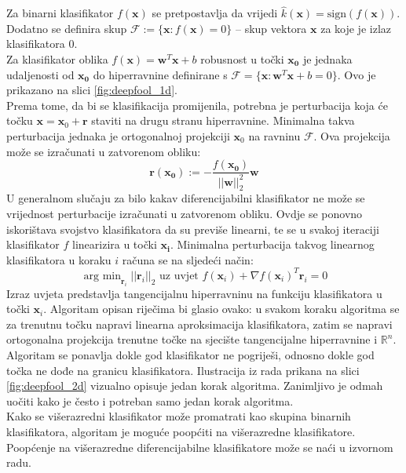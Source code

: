 \documentclass[utf8, diplomski]{fer}
\begin{document}
Za binarni klasifikator $f(\boldsymbol{x})$ se pretpostavlja da vrijedi $\hat{k}(\boldsymbol{x}) = \text{sign}(f(\boldsymbol{x}))$. Dodatno se definira skup $\mathscr{F} := \{\boldsymbol{x} : f(\boldsymbol{x}) = 0\}$ -- skup vektora $\boldsymbol{x}$ za koje je izlaz klasifikatora $0$. \\
Za klasifikator oblika $f(\boldsymbol{x}) = \boldsymbol{w}^{T}\boldsymbol{x} + b$ robusnost u točki $\boldsymbol{x_{0}}$ je jednaka udaljenosti od $\boldsymbol{x_{0}}$ do hiperravnine definirane s $\mathscr{F} = \{\boldsymbol{x} : \boldsymbol{w}^{T}\boldsymbol{x}+b=0\}$. Ovo je prikazano na slici \ref{fig:deepfool_1d}. \\
Prema tome, da bi se klasifikacija promijenila, potrebna je perturbacija koja će točku $\boldsymbol{x} = \boldsymbol{x}_{0} + \boldsymbol{r}$ staviti na drugu stranu hiperravnine. Minimalna takva perturbacija jednaka je ortogonalnoj projekciji $\boldsymbol{x}_{0}$ na ravninu $\mathscr{F}$. Ova projekcija može se izračunati u zatvorenom obliku:
\begin{equation}
	\boldsymbol{r}(\boldsymbol{x_{0}}) := - \frac{f(\boldsymbol{x_{0}})}{||\boldsymbol{w}||_{2}^{2}}\boldsymbol{w}
\end{equation}
U generalnom slučaju za bilo kakav diferencijabilni klasifikator ne može se vrijednost perturbacije izračunati u zatvorenom obliku. Ovdje se ponovno iskorištava svojstvo klasifikatora da su previše linearni, te se u svakoj iteraciji klasifikator $f$ linearizira u točki $\boldsymbol{x_{i}}$. Minimalna perturbacija takvog linearnog klasifikatora u koraku $i$ računa se na sljedeći način:
\begin{equation}
	\mathop{\text{arg min}}_{\boldsymbol{r}_{i}}||\boldsymbol{r}_{i}||_{2} \text{ uz uvjet } f(\boldsymbol{x}_{i}) + \nabla f(\boldsymbol{x}_{i})^{T}\boldsymbol{r}_{i} = 0
\end{equation}
Izraz uvjeta predstavlja tangencijalnu hiperravninu na funkciju klasifikatora u točki $\boldsymbol{x}_{i}$. Algoritam opisan riječima bi glasio ovako: u svakom koraku algoritma se za trenutnu točku napravi linearna aproksimacija klasifikatora, zatim se napravi ortogonalna projekcija trenutne točke na sjecište tangencijalne hiperravnine i $\mathbb{R}^{n}$. Algoritam se ponavlja dokle god klasifikator ne pogriješi, odnosno dokle god točka ne dođe na granicu klasifikatora. Ilustracija iz rada prikana na slici \ref{fig:deepfool_2d} vizualno opisuje jedan korak algoritma. Zanimljivo je odmah uočiti kako je često i potreban samo jedan korak algoritma. \\
Kako se višerazredni klasifikator može promatrati kao skupina binarnih klasifikatora, algoritam je moguće poopćiti na višerazredne klasifikatore. Poopćenje na višerazredne diferencijabilne klasifikatore može se naći u izvornom radu\citep{MoosaviDezfooli2016DeepFoolAS}. \\
\end{document}
